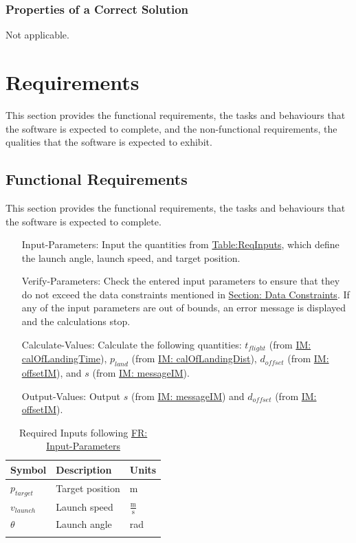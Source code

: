 \documentclass[12pt]{article}
\begin{document}
\subsubsection{Properties of a Correct Solution}
\label{Sec:CorSolProps}
Not applicable.
\section{Requirements}
\label{Sec:Requirements}
This section provides the functional requirements, the tasks and behaviours that the software is expected to complete, and the non-functional requirements, the qualities that the software is expected to exhibit.
\subsection{Functional Requirements}
\label{Sec:FRs}
This section provides the functional requirements, the tasks and behaviours that the software is expected to complete.
\begin{itemize}
\item[Input-Parameters:\phantomsection\label{inputParams}]Input the quantities from \hyperref[Table:ReqInputs]{Table:ReqInputs}, which define the launch angle, launch speed, and target position.
\item[Verify-Parameters:\phantomsection\label{verifyParams}]Check the entered input parameters to ensure that they do not exceed the data constraints mentioned in \hyperref[Sec:DataConstraints]{Section: Data Constraints}. If any of the input parameters are out of bounds, an error message is displayed and the calculations stop.
\item[Calculate-Values:\phantomsection\label{calcValues}]Calculate the following quantities: ${t_{flight}}$ (from \hyperref[IM:calOfLandingTime]{IM: calOfLandingTime}), ${p_{land}}$ (from \hyperref[IM:calOfLandingDist]{IM: calOfLandingDist}), ${d_{offset}}$ (from \hyperref[IM:offsetIM]{IM: offsetIM}), and $s$ (from \hyperref[IM:messageIM]{IM: messageIM}).
\item[Output-Values:\phantomsection\label{outputValues}]Output $s$ (from \hyperref[IM:messageIM]{IM: messageIM}) and ${d_{offset}}$ (from \hyperref[IM:offsetIM]{IM: offsetIM}).
\end{itemize}
\begin{longtable}{l l l}
\toprule
\textbf{Symbol} & \textbf{Description} & \textbf{Units}
\\
\midrule
\endhead
${p_{target}}$ & Target position & m
\\
${v_{launch}}$ & Launch speed & $\frac{\text{m}}{\text{s}}$
\\
$θ$ & Launch angle & rad
\\
\bottomrule
\caption{Required Inputs following \hyperref[inputParams]{FR: Input-Parameters}}
\label{Table:ReqInputs}
\end{longtable}
\end{document}
